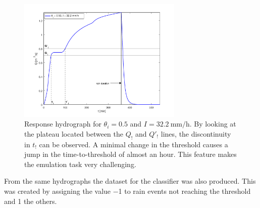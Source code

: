 \begin{figure}[h]
  \centering
  \includegraphics[width=0.7\textwidth]{Figures/hydrograph.png}
  \caption{Response hydrograph for $\theta_i = \num{0.5}$ and $I = \SI{32.2}{\milli\meter\per\hour}$. By looking at the plateau located between the $Q_!$ and $Q'_!$ lines, the discontinuity in $t_!$ can be observed. A minimal change in the threshold causes a jump in the time-to-threshold of almost an hour. This feature makes the emulation task very challenging.}
  \label{fig:hydrograph}
\end{figure}


From the same hydrographs the dataset for the classifier was also produced.
This was created by assigning the value \num{-1} to rain events not reaching the threshold and \num{1} the others.

